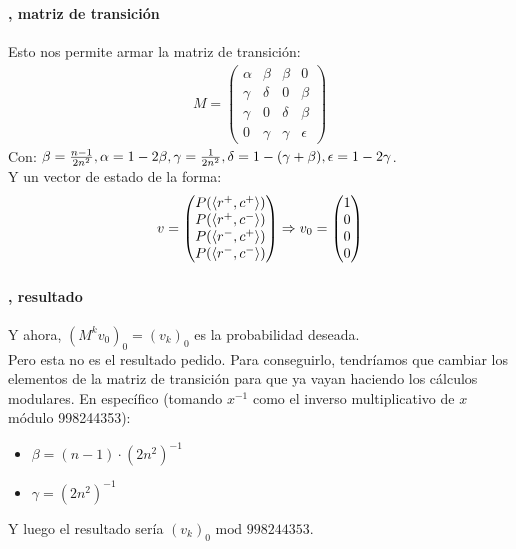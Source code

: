 \documentclass[../main.tex]{subfiles}
\begin{document}
\begin{frame}
  \frametitle{\SECTIOND}
  \framesubtitle{\EJE, matriz de transición}

  Esto nos permite armar la matriz de transición:
  \begin{gather*}
    M = \begin{pmatrix}
      \alpha & \beta & \beta & 0 \\
      \gamma & \delta & 0 & \beta \\
      \gamma & 0 & \delta & \beta \\
      0 & \gamma & \gamma & \epsilon
    \end{pmatrix}
  \end{gather*}
  Con: \(\beta = \frac{n-1}{2n^{2}}, \alpha = 1 - 2\beta, \gamma = \frac{1}{2n^{2}}, \delta = 1 - (\gamma + \beta), \epsilon = 1 - 2\gamma\). \pause \\
  Y un vector de estado de la forma:
  \begin{gather*}
    v = \begin{pmatrix}
      P(\langle r^{+}, c^{+} \rangle) \\ P(\langle r^{+}, c^{-} \rangle) \\ P(\langle r^{-}, c^{+} \rangle) \\ P(\langle r^{-}, c^{-} \rangle)
    \end{pmatrix} \Rightarrow v_{0} = \begin{pmatrix}
      1 \\ 0 \\ 0 \\ 0
    \end{pmatrix}
  \end{gather*}
\end{frame}

\begin{frame}
  \frametitle{\SECTIOND}
  \framesubtitle{\EJE, resultado}

  Y ahora, \((M^{k}v_{0})_{0} = (v_{k})_{0}\) es la probabilidad deseada. \pause \\
  Pero esta no es el resultado pedido. \pause Para conseguirlo, tendríamos que cambiar los elementos de la matriz de transición para que ya vayan haciendo los cálculos modulares. \pause En específico (tomando \(x^{-1}\) como el inverso multiplicativo de \(x\) módulo 998244353):
  \begin{itemize}
    \item \(\beta = (n-1) \cdot (2n^{2})^{-1}\)
    \item \(\gamma = (2n^{2})^{-1}\)
  \end{itemize}
  \pause Y luego el resultado sería \((v_{k})_{0} \text{ mod } 998244353\).
\end{frame}
\end{document}
